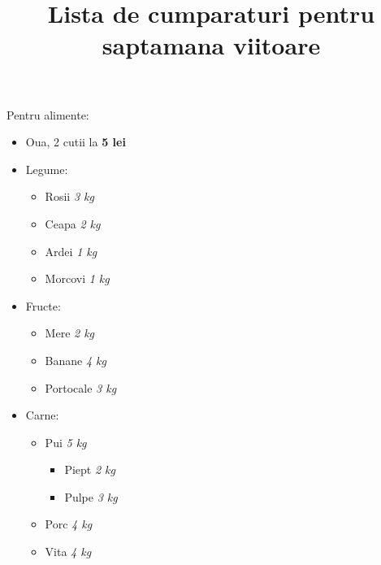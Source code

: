 \documentclass{article}
\begin{document}
\title{Lista de cumparaturi pentru saptamana viitoare}

Pentru alimente:
\begin{itemize}
    \item Oua, 2 cutii la \textbf{5 lei}
    \item Legume:
        \begin{itemize}
            \item Rosii \textit{3 kg}
            \item Ceapa \textit{2 kg}
            \item Ardei \textit{1 kg}
            \item Morcovi \textit{1 kg}
        \end{itemize}    
    \item Fructe:
        \begin{itemize}
            \item Mere \textit{2 kg}
            \item Banane \textit{4 kg}
            \item Portocale \textit{3 kg}
        \end{itemize}
    \item Carne:
        \begin{itemize} 
            \item Pui \textit{5 kg}
            \begin{itemize}
                \item Piept \textit{2 kg}
                \item Pulpe \textit{3 kg}
            \end{itemize}
            \item Porc \textit{4 kg}
            \item Vita \textit{4 kg}

        \end{itemize}

\end{itemize}
\end{document}
